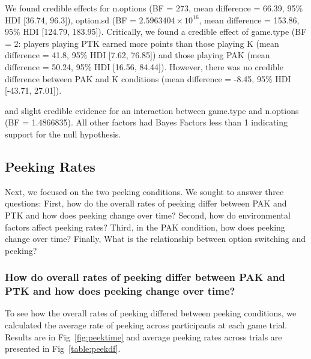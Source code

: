 \documentclass[a4paper,doc,natbib,floatsintext]{apa6}\usepackage[]{graphicx}\usepackage[]{color}
\begin{document}
We found credible effects for n.options (BF = 273, mean difference = 66.39, 95\% HDI [36.74, 96.3]), option.sd (BF = \ensuremath{2.5963404\times 10^{16}}, mean difference = 153.86, 95\% HDI [124.79, 183.95]). Critically, we found a credible effect of game.type (BF = 2: players playing PTK earned more points than those playing K (mean difference = 41.8, 95\% HDI [7.62, 76.85]) and those playing PAK (mean difference = 50.24, 95\% HDI [16.56, 84.44]). However, there was no credible difference between PAK and K conditions (mean difference = -8.45, 95\% HDI [-43.71, 27.01]).

and slight credible evidence for an interaction between game.type and n.options (BF = 1.4866835). All other factors had Bayes Factors less than 1 indicating support for the null hypothesis.


\subsection{Peeking Rates}

Next, we focused on the two peeking conditions. We sought to answer three questions: First, how do the overall rates of peeking differ between PAK and PTK and how does peeking change over time? Second, how do environmental factors affect peeking rates? Third, in the PAK condition, how does peeking change over time? Finally, What is the relationship between option switching and peeking? 

\subsubsection{How do overall rates of peeking differ between PAK and PTK and how does peeking change over time?}

To see how the overall rates of peeking differed between peeking conditions, we calculated the average rate of peeking across participants at each game trial. Results are in Fig~\ref{fig:peektime} and average peeking rates across trials are presented in Fig~\ref{table:peekdf}.
\end{document}
